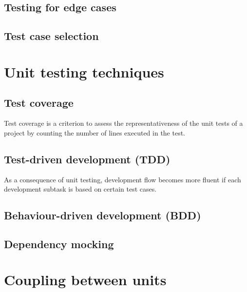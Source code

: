 \documentclass{article}
\begin{document}
\subsection{Testing for edge cases}

\subsection{Test case selection}

\section{Unit testing techniques}
\subsection{Test coverage}
Test coverage is a criterion to assess the representativeness of the unit tests of a project by counting the number of lines executed in the test.


\subsection{Test-driven development (TDD)}
As a consequence of unit testing, development flow becomes more fluent if each development subtask is based on certain test cases.

\subsection{Behaviour-driven development (BDD)}


\subsection{Dependency mocking}

\section{Coupling between units}
\end{document}
